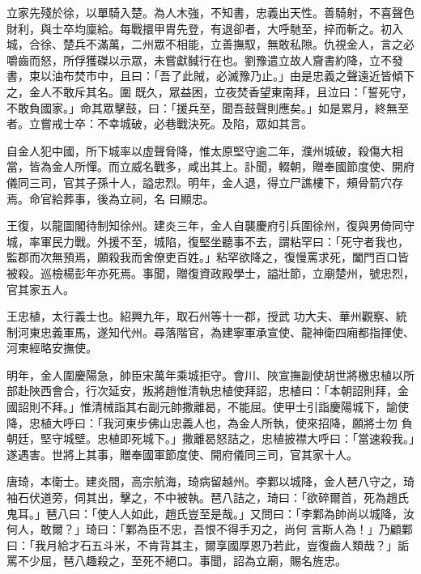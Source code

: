 \begin{pinyinscope}
 立家先殘於徐，以單騎入楚。為人木強，不知書，忠義出天性。善騎射，不喜聲色財利，與士卒均廩給。每戰擐甲胄先登，有退卻者，大呼馳至，捽而斬之。初入城，合徐、楚兵不滿萬，二州眾不相能，立善撫馭，無敢私隙。仇視金人，言之必嚼齒而怒，所俘獲磔以示眾，未嘗獻馘行在也。劉豫遣立故人齎書約降，立不發書，束以油布焚市中，且曰：「吾了此賊，必滅豫乃止。」由是忠義之聲遠近皆傾下之，金人不敢斥其名。圍
 既久，眾益困，立夜焚香望東南拜，且泣曰：「誓死守，不敢負國家。」命其眾擊鼓，曰：「援兵至，聞吾鼓聲則應矣。」如是累月，終無至者。立嘗戒士卒：不幸城破，必巷戰決死。及陷，眾如其言。



 自金人犯中國，所下城率以虛聲脅降，惟太原堅守逾二年，濮州城破，殺傷大相當，皆為金人所憚。而立威名戰多，咸出其上。訃聞，輟朝，贈奉國節度使、開府儀同三司，官其子孫十人，謚忠烈。明年，金人退，得立尸譙樓下，頰骨箭穴存焉。命官給葬事，後為立祠，名
 曰顯忠。



 王復，以龍圖閣待制知徐州。建炎三年，金人自襲慶府引兵圍徐州，復與男倚同守城，率軍民力戰。外援不至，城陷，復堅坐聽事不去，謂粘罕曰：「死守者我也，監郡而次無預焉，願殺我而舍僚吏百姓。」粘罕欲降之，復慢罵求死，闔門百口皆被殺。巡檢楊彭年亦死焉。事聞，贈復資政殿學士，謚壯節，立廟楚州，號忠烈，官其家五人。



 王忠植，太行義士也。紹興九年，取石州等十一郡，授武
 功大夫、華州觀察、統制河東忠義軍馬，遂知代州。尋落階官，為建寧軍承宣使、龍神衛四廂都指揮使、河東經略安撫使。



 明年，金人圍慶陽急，帥臣宋萬年乘城拒守。會川、陜宣撫副使胡世將檄忠植以所部赴陜西會合，行次延安，叛將趙惟清執忠植使拜詔，忠植曰：「本朝詔則拜，金國詔則不拜。」惟清械詣其右副元帥撒離曷，不能屈。使甲士引詣慶陽城下，諭使降，忠植大呼曰：「我河東步佛山忠義人也，為金人所執，使來招降，願將士勿
 負朝廷，堅守城壁。忠植即死城下。」撒離曷怒詰之，忠植披襟大呼曰：「當速殺我。」遂遇害。世將上其事，贈奉國軍節度使、開府儀同三司，官其家十人。



 唐琦，本衛士。建炎間，高宗航海，琦病留越州。李鄴以城降，金人琶八守之，琦袖石伏道旁，伺其出，擊之，不中被執。琶八詰之，琦曰：「欲碎爾首，死為趙氏鬼耳。」琶八曰：「使人人如此，趙氏豈至是哉。」又問曰：「李鄴為帥尚以城降，汝何人，敢爾？」琦曰：「鄴為臣不忠，吾恨不得手刃之，尚何
 言斯人為！」乃顧鄴曰：「我月給才石五斗米，不肯背其主，爾享國厚恩乃若此，豈復齒人類哉？」詬罵不少屈，琶八趣殺之，至死不絕口。事聞，詔為立廟，賜名旌忠。




\end{pinyinscope}
